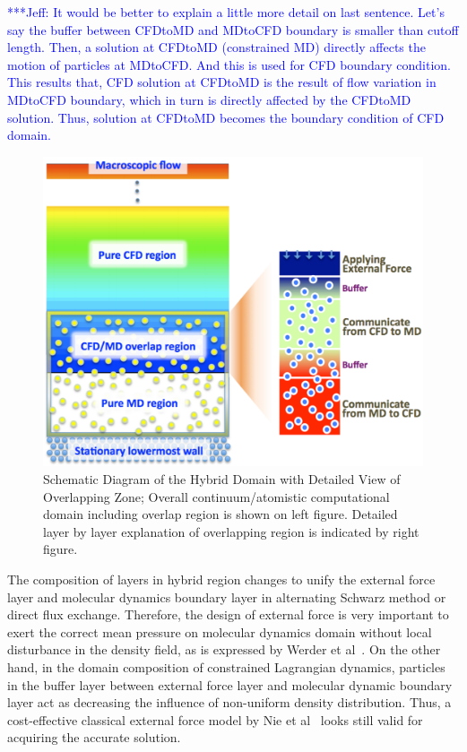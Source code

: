 \documentclass[conference,final]{IEEEtran}
\newcommand{\skonote}[1]{ {\textcolor{blue} { ***Jeff: #1 }}}
\newcommand{\skonote}[1]{}
\begin{document}
\skonote{It would be better to explain a little more detail on last sentence. Let's say the buffer between CFDtoMD and MDtoCFD boundary is smaller than cutoff length. Then, a solution at CFDtoMD (constrained MD) directly affects the motion of particles at MDtoCFD. And this is used for CFD boundary condition. This results that, CFD solution at CFDtoMD is the result of flow variation in MDtoCFD boundary, which in turn is directly affected by the CFDtoMD solution. Thus, solution at CFDtoMD becomes the boundary condition of CFD domain.}


\begin{figure}
\centering
\includegraphics[width=1.0\linewidth]{Couette7.pdf}
\vskip-0.2cm
\caption{\small Schematic Diagram of the Hybrid Domain with Detailed View of Overlapping Zone; Overall continuum/atomistic computational domain including overlap region is shown on left figure. Detailed layer by layer explanation of overlapping region is indicated by right figure.}
\label{Fig:Couette}
\vspace{-1em}
\end{figure}


The composition of layers in hybrid region changes to unify the external force layer and molecular dynamics boundary layer in alternating Schwarz method or direct flux exchange. Therefore, the design of external force is very important to exert the correct mean pressure on molecular dynamics domain without local disturbance in the density field, as is expressed by Werder et al~\cite{Werder}. On the other hand, in the domain composition of constrained Lagrangian dynamics, particles in the buffer layer between external force layer and molecular dynamic boundary layer act as decreasing the influence of non-uniform density distribution. Thus, a cost-effective classical external force model by Nie et al~\cite{Nie} looks still valid for acquiring the accurate solution.
\end{document}
